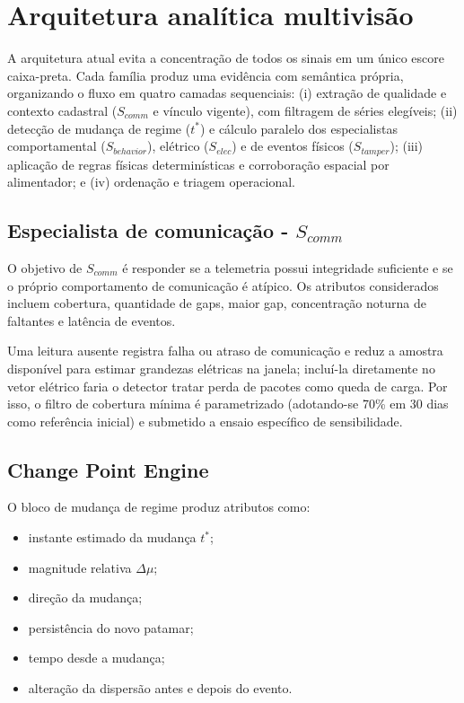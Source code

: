 \chapter{Arquitetura analítica multivisão}\label{arquitetura-analuxedtica-multivisuxe3o}

A arquitetura atual evita a concentração de todos os sinais em um único escore caixa-preta. Cada família produz uma evidência com semântica própria, organizando o fluxo em quatro camadas sequenciais: (i) extração de qualidade e contexto cadastral ($S_{comm}$ e vínculo vigente), com filtragem de séries elegíveis; (ii) detecção de mudança de regime ($t^*$) e cálculo paralelo dos especialistas comportamental ($S_{behavior}$), elétrico ($S_{elec}$) e de eventos físicos ($S_{tamper}$); (iii) aplicação de regras físicas determinísticas e corroboração espacial por alimentador; e (iv) ordenação e triagem operacional.

\section{\texorpdfstring{Especialista de comunicação - \(S_{comm}\)}{Especialista de comunicação - S\_\{comm\}}}\label{especialista-de-comunicauxe7uxe3o---s_comm}

O objetivo de \(S_{comm}\) é responder se a telemetria possui integridade suficiente e se o próprio comportamento de comunicação é atípico. Os atributos considerados incluem cobertura, quantidade de gaps, maior gap, concentração noturna de faltantes e latência de eventos.

Uma leitura ausente registra falha ou atraso de comunicação e reduz a amostra disponível para estimar grandezas elétricas na janela; incluí-la diretamente no vetor elétrico faria o detector tratar perda de pacotes como queda de carga. Por isso, o filtro de cobertura mínima é parametrizado (adotando-se 70\% em 30 dias como referência inicial) e submetido a ensaio específico de sensibilidade.

\section{Change Point Engine}\label{change-point-engine}

O bloco de mudança de regime produz atributos como:

\begin{itemize}
\item
  instante estimado da mudança \(t^*\);
\item
  magnitude relativa \(\Delta\mu\);
\item
  direção da mudança;
\item
  persistência do novo patamar;
\item
  tempo desde a mudança;
\item
  alteração da dispersão antes e depois do evento.
\end{itemize}

